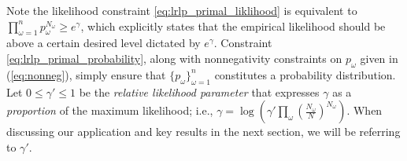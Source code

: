\documentclass[12pt]{amsart}
\newcommand{\x}{\mathbf{x}}
\renewcommand{\c}{\mathbf{c}}
\newcommand{\q}{\mathbf{q}}
\renewcommand{\b}{\mathbf{b}}
\renewcommand{\d}{\mathbf{d}}
\newcommand{\st}{\mbox{s.t.}}
\begin{document}
Note the likelihood constraint \eqref{eq:lrlp_primal_liklihood} is equivalent to $\prod_{\omega=1}^n p_\omega^{N_\omega} \geq e^\gamma$, which explicitly states that the empirical likelihood should be above a certain desired level dictated by $e^\gamma$. 
Constraint \eqref{eq:lrlp_primal_probability}, along with nonnegativity constraints on $p_\omega$ given in (\ref{eq:nonneg}), simply ensure that $\{p_\omega\}_{\omega=1}^{n}$ constitutes a probability distribution. 
Let $0 \leq \gamma' \leq 1$ be the \emph{relative likelihood parameter} that expresses $\gamma$ as a {\it proportion} of the maximum likelihood; i.e., $\gamma = \log( \gamma' \prod_\omega (\tfrac{N_\omega}{N})^{N_\omega})$.
When discussing our application and key results in the next section, we will be referring to $\gamma'$. 

% 
\end{document}
